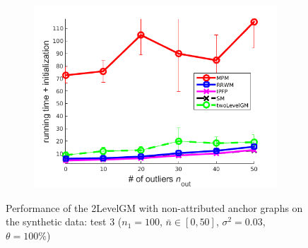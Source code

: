 \begin{figure}[h]
\begin{subfigure}[b]{0.3\textwidth}
			\includegraphics[scale=0.25]{"chapter3/fig/SyntheticTest/no_descr/Results_v4.3.3/Test1/time_summary_avg10t"} 
		\end{subfigure} 	
	\caption[Performance of the 2LevelGM with non-attributed anchor graphs on the synthetic data (test $3$)]{Performance of the 2LevelGM with non-attributed anchor graphs on the synthetic data: test $3$ ($n_1=100$, $\bar{n}\in[0,50]$, $\sigma^2=0.03$, $\theta=100\%$)}
	\label{fig:synTest3_ver433}
\end{figure}
\vspace{-20pt}
